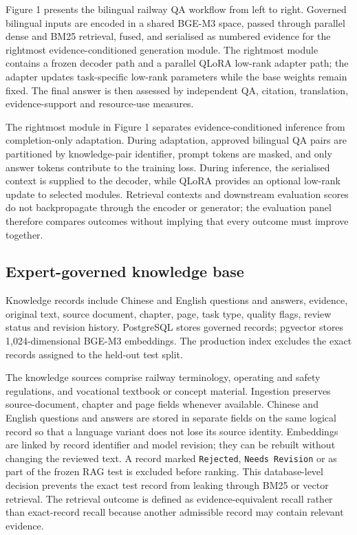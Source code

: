 Figure 1 presents the bilingual railway QA workflow from left to right. Governed bilingual inputs are encoded in a shared BGE-M3 space, passed through parallel dense and BM25 retrieval, fused, and serialised as numbered evidence for the rightmost evidence-conditioned generation module. The rightmost module contains a frozen decoder path and a parallel QLoRA low-rank adapter path; the adapter updates task-specific low-rank parameters while the base weights remain fixed. The final answer is then assessed by independent QA, citation, translation, evidence-support and resource-use measures.

The rightmost module in Figure 1 separates evidence-conditioned inference from completion-only adaptation. During adaptation, approved bilingual QA pairs are partitioned by knowledge-pair identifier, prompt tokens are masked, and only answer tokens contribute to the training loss. During inference, the serialised context is supplied to the decoder, while QLoRA provides an optional low-rank update to selected modules. Retrieval contexts and downstream evaluation scores do not backpropagate through the encoder or generator; the evaluation panel therefore compares outcomes without implying that every outcome must improve together.

\subsection{Expert-governed knowledge base}

Knowledge records include Chinese and English questions and answers, evidence, original text, source document, chapter, page, task type, quality flags, review status and revision history. PostgreSQL stores governed records; pgvector stores 1,024-dimensional BGE-M3 embeddings. The production index excludes the exact records assigned to the held-out test split.

The knowledge sources comprise railway terminology, operating and safety regulations, and vocational textbook or concept material. Ingestion preserves source-document, chapter and page fields whenever available. Chinese and English questions and answers are stored in separate fields on the same logical record so that a language variant does not lose its source identity. Embeddings are linked by record identifier and model revision; they can be rebuilt without changing the reviewed text. A record marked \texttt{Rejected}, \texttt{Needs Revision} or as part of the frozen RAG test is excluded before ranking. This database-level decision prevents the exact test record from leaking through BM25 or vector retrieval. The retrieval outcome is defined as evidence-equivalent recall rather than exact-record recall because another admissible record may contain relevant evidence.

